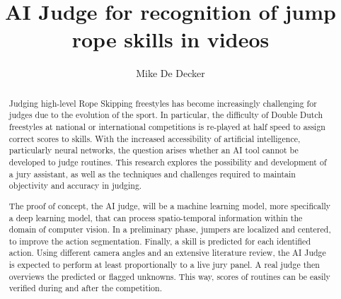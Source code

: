 \documentclass[english]{hogent-article}
\title{AI Judge for recognition of jump rope skills in videos}
\author{Mike De Decker}
\begin{document}
\begin{abstract}
Judging high-level Rope Skipping freestyles has become increasingly challenging for judges due to the evolution of the sport. In particular, the difficulty of Double Dutch freestyles at national or international competitions is re-played at half speed to assign correct scores to skills. With the increased accessibility of artificial intelligence, particularly neural networks, the question arises whether an AI tool cannot be developed to judge routines. This research explores the possibility and development of a jury assistant, as well as the techniques and challenges required to maintain objectivity and accuracy in judging.

The proof of concept, the AI judge, will be a machine learning model, more specifically a deep learning model, that can process spatio-temporal information within the domain of computer vision. In a preliminary phase, jumpers are localized and centered, to improve the action segmentation. Finally, a skill is predicted for each identified action.  Using different camera angles and an extensive literature review, the AI Judge is expected to perform at least proportionally to a live jury panel. A real judge then overviews the predicted or flagged unknowns. This way, scores of routines can be easily verified during and after the competition.
\end{abstract}

\tableofcontents



\printbibliography[heading=bibintoc]
\end{document}
